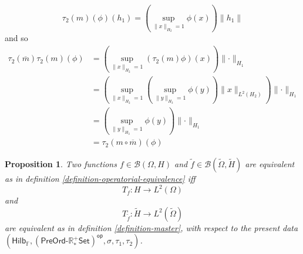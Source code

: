 \documentclass[a4paper,10pt]{article}
\theoremstyle{plain}
\newtheorem{proposition}[theorem]{Proposition}
\theoremstyle{definition}
\theoremstyle{remark}
\begin{document}
\[ \tau_2(m)(\phi)(h_1) = \left( \underset{\lVert x \rVert_{H_2} = 1}{\operatorname{sup}} \phi(x) \right) \lVert h_1 \rVert \]
and so
\begin{align*}
  \tau_2(\overline{m}) \tau_2(m) (\phi) & = \left( \underset{\lVert x \rVert_{H_2} = 1}{\operatorname{sup}} (\tau_2(m) \phi)(x) \right)  \lVert \cdot \rVert_{H_1}                                                                                           \\
                                        & =  \left( \underset{\lVert x \rVert_{H_2} = 1}{\operatorname{sup}} \left( \underset{\lVert y \rVert_{H_3} = 1}{\operatorname{sup}} \phi(y) \right)  \lVert x \rVert_{L^2(H_2)} \right)  \lVert  \cdot \rVert_{H_1} \\
                                        & = \left( \underset{\lVert y \rVert_{H_3} = 1}{\operatorname{sup}} \phi(y) \right)  \lVert \cdot \rVert_{H_1}                                                                                                       \\
                                        & = \tau_2(m \circ \overline{m}) (\phi)
\end{align*}

\begin{proposition}
  Two functions $f \in \mathsf{\mathcal{B}}(\Omega,H)$ and $\tilde{f} \in \mathsf{\mathcal{B}}(\tilde{\Omega},\tilde{H})$ are equivalent as in definition \ref{definition-operatorial-equivalence} iff
  \[ T_f : H \to L^2(\Omega) \]
  and
  \[ T_{\tilde{f}} : \tilde{H} \to L^2(\tilde{\Omega}) \]
  are equivalent as in definition \ref{definition-master}, with respect to the present data $(\mathsf{Hilb_\mathbb{F}},\mathsf{(PreOrd\text{-}\mathbb{R}^+_*Set)^{op}},\sigma,\tau_1,\tau_2)$.
\end{proposition}
\end{document}
